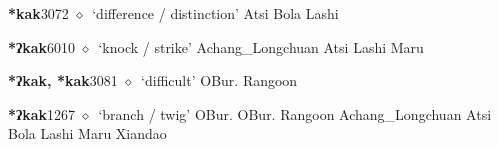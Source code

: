   \begin{list}{}{\leftmargin=1.5em \itemindent=-1.5em}
  \item {\footnotesize \textbf{*kak}}{\tiny 3072}
         $\diamond$~`difference / distinction'
         Atsi 
\hspace{1ex}
         Bola 
\hspace{1ex}
         Lashi 
  \item {\footnotesize \textbf{*ʔkak}}{\tiny 6010}
\hspace{1ex}
         $\diamond$~`knock / strike'
         Achang\_Longchuan 
\hspace{1ex}
         Atsi 
\hspace{1ex}
         Lashi 
\hspace{1ex}
         Maru 
  \item {\footnotesize \textbf{*ʔkak, *kak}}{\tiny 3081}
\hspace{1ex}
         $\diamond$~`difficult'
         OBur. 
\hspace{1ex}
         Rangoon 
  \item {\footnotesize \textbf{*ʔkak}}{\tiny 1267}
\hspace{1ex}
         $\diamond$~`branch / twig'
         OBur. 
\hspace{1ex}
         OBur. 
\hspace{1ex}
         Rangoon 
\hspace{1ex}
         Achang\_Longchuan 
\hspace{1ex}
         Atsi 
\hspace{1ex}
         Bola 
\hspace{1ex}
         Lashi 
\hspace{1ex}
         Maru 
\hspace{1ex}
         Xiandao 

\end{list}
